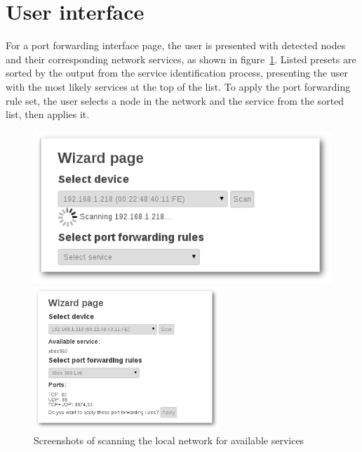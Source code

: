 \documentclass[a4paper,11pt,makeidx]{kth-bcs}
\begin{document}
   \section{User interface}
For a port forwarding interface page, the user is presented with detected nodes and their corresponding network services, as shown in figure~\ref{fig:scanning}.
Listed presets are sorted by the output from the service identification process, presenting the user with the most likely services at the top of the list.
To apply the port forwarding rule set, the user selects a node in the network and the service from the sorted list, then applies it.


\begin{figure}[h]
   \begin{minipage}[b]{0.45\linewidth}
      \centering
      \includegraphics[width=\textwidth]{ss-scanning-shadow}
   \end{minipage}
   \hspace{0.5cm}
   \begin{minipage}[b]{0.45\linewidth}
      \centering
      \includegraphics[width=7cm]{ss-scanned-shadow}
   \end{minipage}
   \caption{Screenshots of scanning the local network for available services}
   \label{fig:scanning}
\end{figure}
\end{document}

